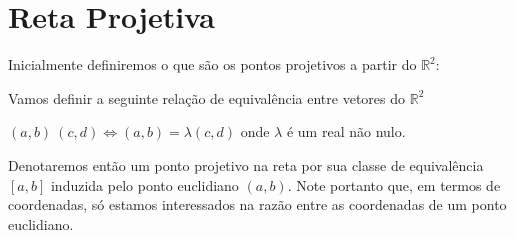 \chapter{Reta Projetiva}

Inicialmente definiremos o que são os pontos projetivos a partir do $\mathbb{R}^2$:

\begin{defn}
Vamos definir a seguinte relação de equivalência entre vetores do $\mathbb{R}^2$

$(a,b)~(c,d)\Leftrightarrow (a,b)=\lambda (c,d)$ onde $\lambda$ é um real não nulo.

Denotaremos então um ponto projetivo na reta por sua classe de equivalência $[a,b]$ induzida pelo ponto euclidiano $(a,b)$. Note portanto que, em termos de coordenadas, só estamos interessados na razão entre as coordenadas de um ponto euclidiano.

\end{defn} 
